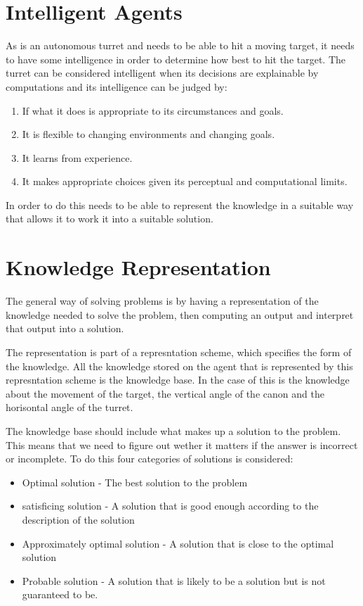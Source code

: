 \section{Intelligent Agents}

As \name is an autonomous turret and needs to be able to hit a moving target,
it needs to have some intelligence in order to determine how best to hit the
target. The turret can be considered intelligent when its decisions
are explainable by computations and its intelligence can be judged by:

\begin{enumerate}
  \item If what it does is appropriate to its circumstances and goals.
  \item It is flexible to changing environments and changing goals.
  \item It learns from experience.
  \item It makes appropriate choices given its perceptual and computational
  limits.
\end{enumerate}

In order to do this \name needs to be able to represent the knowledge in a
suitable way that allows it to work it into a suitable solution.


\section{Knowledge Representation}
The general way of solving problems is by having a representation of the
knowledge needed to solve the problem, then computing an output and interpret
that output into a solution.\nl

The representation is part of a represntation scheme, which specifies the form
of the knowledge. All the knowledge stored on the agent that is represented by
this represntation scheme is the knowledge base. In the case of \name this is
the knowledge about the movement of the target, the vertical angle of the canon
and the horisontal angle of the turret.\nl

The knowledge base should include what makes up a solution to the problem. This
means that we need to figure out wether it matters if the answer is incorrect or
incomplete. To do this four categories of solutions is considered:

\begin{itemize}
  \item Optimal solution - The best solution to the problem
  \item satisficing solution - A solution that is good enough according to the
  description of the solution
  \item Approximately optimal solution - A solution that is close to the optimal
  solution
  \item Probable solution - A solution that is likely to be a solution but is
  not guaranteed to be.
\end{itemize}

